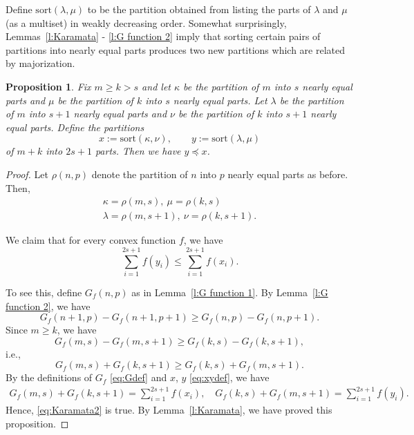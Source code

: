\documentclass[12pt]{amsart}
\newtheorem{prop}[thm]{Proposition}
\theoremstyle{definition}
\numberwithin{equation}{section}
\newcommand{\defeq}{:=}
\newcommand{\sort}{\mathrm{sort}}
\begin{document}
Define $\sort(\lambda,\mu)$ to be the partition obtained from listing the parts of $\lambda$ and $\mu$ (as a multiset) in weakly decreasing order.
Somewhat surprisingly, Lemmas~\ref{l:Karamata} - \ref{l:G function 2} imply that sorting certain
pairs of partitions into nearly equal parts
produces two new partitions which are related by majorization.

\begin{prop}\label{p:nearly equal parts maj order}
    Fix $m \geq k > s$ and let $\kappa$ be the partition of $m$ into $s$ nearly equal parts and $\mu$ be the partition of $k$ into $s$ nearly equal parts. Let $\lambda$ be the partition of $m$ into $s+1$ nearly equal parts and $\nu$ be the partition of $k$ into $s+1$ nearly equal parts.
    Define the partitions
    \begin{equation}\label{eq:xydef}
    x\defeq \sort(
    \kappa, \nu), \qquad y \defeq \sort(\lambda,\mu)
    \end{equation}
    of $m+k$ into $2s+1$ parts.  Then we have $y \preceq x$.
\end{prop}

\begin{proof}
    Let $\rho(n, p)$ denote the partition of $n$ into $p$ nearly equal parts as before. Then,
\begin{gather*}
    \kappa = \rho(m, s),\ \mu = \rho(k, s) \\
    \lambda = \rho(m, s+1),\ \nu = \rho(k, s+1).
\end{gather*}

We claim that for every convex function $f$, we have
\begin{equation}\label{eq:Karamata2}
    \sum_{i=1}^{2s+1} f(y_i) \leq \sum_{i=1}^{2s+1} f(x_i).
\end{equation}

To see this, define $G_f(n,p)$ as in Lemma~\ref{l:G function 1}.
By Lemma~\ref{l:G function 2}, we have
\begin{equation*}
    G_f(n+1,p) - G_f(n+1,p+1) \geq G_f(n,p)- G_f(n,p+1).
\end{equation*} Since $m\geq k$, we have
\begin{equation*}
    G_f(m,s) - G_f(m,s+1) \geq G_f(k,s) - G_f(k,s+1),
\end{equation*}
i.e.,
\begin{equation*}
    G_f(m,s) + G_f(k,s+1)  \geq G_f(k,s) + G_f(m,s+1).
\end{equation*}
By the definitions of $G_f$ \eqref{eq:Gdef} and $x$, $y$ \eqref{eq:xydef},
we have \begin{gather*}
    G_f(m,s) + G_f(k,s+1) = \sum_{i=1}^{2s+1} f(x_i), \quad
    G_f(k,s) + G_f(m,s+1) = \sum_{i=1}^{2s+1} f(y_i).
\end{gather*} Hence, \eqref{eq:Karamata2} is true. By Lemma~\ref{l:Karamata}, we have proved this proposition.

\end{proof}
\end{document}
